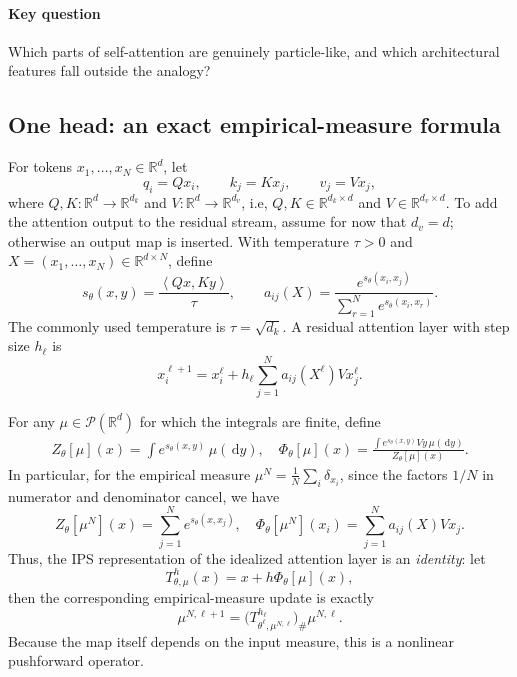 \documentclass[11pt]{amsart}
\numberwithin{equation}{section}
\theoremstyle{plain}
\newcommand{\R}{\mathbb{R}}
\newcommand{\cP}{\mathcal{P}}
\newcommand{\dd}{\,\mathrm{d}}
\newcommand{\ip}[2]{\left\langle#1,#2\right\rangle}
\begin{document}
\paragraph{\textbf{Key question}}
Which parts of self-attention are genuinely particle-like, and which
architectural features fall outside the analogy?

\subsection{One head: an exact empirical-measure formula}
For tokens $x_1,\ldots,x_N\in\R^d$, let
\[
  q_i=Qx_i,\qquad k_j=Kx_j,\qquad v_j=Vx_j,
\]
where $Q,K:\R^d\to\R^{d_k}$ and $V:\R^d\to\R^{d_v}$, i.e, $Q,K\in \R^{d_k\times d}$ and $V\in \R^{d_v\times d}$.  To add the attention
output to the residual stream, assume for now that $d_v=d$; otherwise an output
map is inserted.  With temperature $\tau>0$ and $X=(x_1,\ldots,x_N)\in \R^{d\times N}$, define
\begin{equation}\label{eq:attention-weights}
  s_\theta(x,y)=\frac{\ip{Qx}{Ky}}{\tau},\qquad
  a_{ij}(X)=\frac{e^{s_\theta(x_i,x_j)}}
  {\sum_{r=1}^Ne^{s_\theta(x_i,x_r)}}.
\end{equation}
The commonly used temperature is $\tau=\sqrt{d_k}$.  A residual
attention layer with step size $h_\ell$ is
\begin{equation}\label{eq:attention-layer}
    x_i^{\ell+1}=x_i^\ell+
    h_\ell\sum_{j=1}^Na_{ij}(X^\ell)Vx_j^\ell.
\end{equation}

For any $\mu\in\cP(\R^d)$ for which the integrals are finite, define
\begin{equation}\label{eq:attention-field}
 \begin{split}
    Z_\theta[\mu](x)
      =\int e^{s_\theta(x,y)}\,\mu(\dd y),\quad 
    \Phi_\theta[\mu](x)
      =\frac{\displaystyle
        \int e^{s_\theta(x,y)}Vy\,\mu(\dd y)}
       {Z_\theta[\mu](x)}.
 \end{split}
\end{equation}
In particular, for the empirical measure $\mu^{N}=\frac1N\sum_i\delta_{x_i}$, since the factors $1/N$ in numerator and denominator cancel, we have 
\begin{equation}\label{eq:attention-exact}
  Z_\theta[\mu^N](x) = \sum_{j=1}^N e^{s_\theta(x,x_j)},\quad  \Phi_\theta[\mu^{N}](x_i)
  =\sum_{j=1}^N a_{ij}(X)Vx_j.
\end{equation}
Thus, the IPS representation of the idealized attention layer is an
\emph{identity}: let 
\[
  T_{\theta,\mu}^{h}(x)=x+h\Phi_\theta[\mu](x),
\]
then the corresponding empirical-measure update is exactly
\begin{equation}\label{eq:attention-pushforward}
    \mu^{N,\ell+1}
    =\bigl(T_{\theta^\ell,\mu^{N,\ell}}^{h_\ell}\bigr)_\#
      \mu^{N,\ell}.
\end{equation}
Because the map itself depends on the input measure, this is a nonlinear
pushforward operator.
\end{document}
